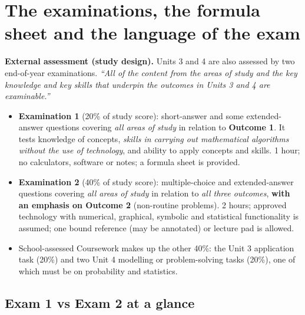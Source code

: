 \section{The examinations, the formula sheet and the language of the exam}
\label{sec:exam}

\begin{sdbox}
\textbf{External assessment (study design).} Units 3 and 4 are also assessed by two end-of-year examinations. \emph{``All of the content from the areas of study and the key knowledge and key skills that underpin the outcomes in Units 3 and 4 are examinable.''}
\begin{itemize}
  \item \textbf{Examination 1} (20\% of study score): short-answer and some extended-answer questions covering \emph{all areas of study} in relation to \textbf{Outcome 1}. It tests knowledge of concepts, \emph{skills in carrying out mathematical algorithms without the use of technology}, and ability to apply concepts and skills. 1 hour; no calculators, software or notes; a formula sheet is provided.
  \item \textbf{Examination 2} (40\% of study score): multiple-choice and extended-answer questions covering \emph{all areas of study} in relation to \emph{all three outcomes}, \textbf{with an emphasis on Outcome 2} (non-routine problems). 2 hours; approved technology with numerical, graphical, symbolic and statistical functionality is assumed; one bound reference (may be annotated) or lecture pad is allowed.
  \item School-assessed Coursework makes up the other 40\%: the Unit 3 application task (20\%) and two Unit 4 modelling or problem-solving tasks (20\%), one of which must be on probability and statistics.
\end{itemize}
\end{sdbox}

\subsection{Exam 1 vs Exam 2 at a glance}

